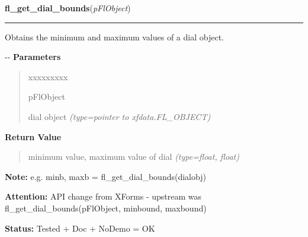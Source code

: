\hspace{.8\funcindent}\begin{boxedminipage}{\funcwidth}

    \raggedright \textbf{fl\_get\_dial\_bounds}(\textit{pFlObject})

    \vspace{-1.5ex}

    \rule{\textwidth}{0.5\fboxrule}
\setlength{\parskip}{2ex}

Obtains the minimum and maximum values of a dial object.

-{}-
\setlength{\parskip}{1ex}
      \textbf{Parameters}
      \vspace{-1ex}

      \begin{quote}
        \begin{Ventry}{xxxxxxxxx}

          \item[pFlObject]


dial object
            {\it (type=pointer to xfdata.FL\_OBJECT)}

        \end{Ventry}

      \end{quote}

      \textbf{Return Value}
    \vspace{-1ex}

      \begin{quote}

minimum value, maximum value of dial
      {\it (type=float, float)}

      \end{quote}

\textbf{Note:} 
e.g. minb, maxb = fl\_get\_dial\_bounds(dialobj)


\textbf{Attention:} 
API change from XForms - upstream was
fl\_get\_dial\_bounds(pFlObject, minbound, maxbound)


\textbf{Status:} 
Tested + Doc + NoDemo = OK


    \end{boxedminipage}

    \label{xformslib:fldial:fl_set_dial_step}

    \vspace{0.5ex}

